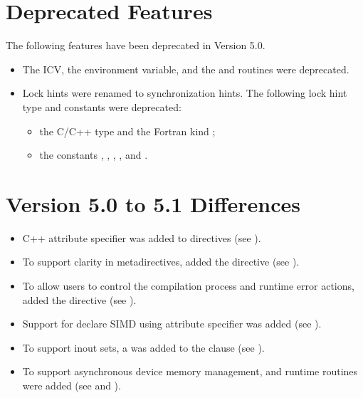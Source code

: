 \section{Deprecated Features}
\label{chap:Deprecated Features}

The following features have been deprecated in Version 5.0.

\begin{itemize}
\item The  ICV, the  environment variable, and
      the  and  routines were deprecated.

\item Lock hints were renamed to synchronization hints. The following lock hint 
      type and constants were deprecated:

\begin{itemize}
\item the C/C++ type  and the Fortran kind
      ;

\item the constants ,
      , ,
      , and .
\end{itemize}
\end{itemize}


\section{Version 5.0 to 5.1 Differences}
\label{sec:Version 5.0 to 5.1 Differences}
\begin{itemize}
\item C++ attribute specifier was added to directives (see ).

\item To support clarity in metadirectives, added the  
      directive (see ).

\item To allow users to control the compilation process and runtime error 
      actions, added the  directive 
      (see ).

\item Support for declare SIMD using attribute specifier was added (see ).

\item To support inout sets, a   was
      added to the  clause (see ).

\item To support asynchronous device memory management,
   and
   runtime routines were added (see
   and
  ).
\end{itemize}


